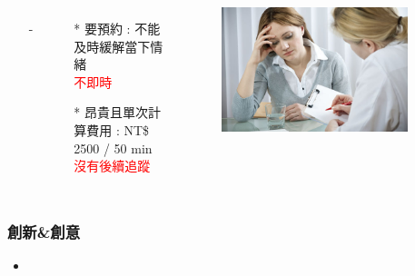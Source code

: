 \documentclass[10pt, conference, compsocconf]{beamer}
\begin{document}
\begin{CJK}{UTF8}{}
\begin{frame}
\begin{columns}
\begin{itemize}
\item[-] \large{}
\vspace{5mm}
\end{itemize}
\begin{itemize}
\item[*]  要預約 : 不能及時緩解當下情緒\\
\vspace{2mm}
\textcolor{red}{不即時}
\vspace{5mm}
\item[*]  昂貴且單次計算費用 : NT\$ 2500 / 50 min\\
\vspace{2mm}
\textcolor{red}{沒有後續追蹤}
\end{itemize}
\begin{figure}[!t]
\begin{flushright}
\includegraphics[width=0.9\textwidth]{Figures/3.jpg}
\end{flushright}
\end{figure}
\end{columns}

\end{frame}


\begin{frame}
\frametitle{創新\&創意}

\begin{itemize}
\item{}
\end{itemize}
\vspace{8mm}
\begin{table}[!h]
\small
\centering
{}
\label{tab:accuracy}
\end{table}


\end{frame}
\end{CJK}
\end{document}
